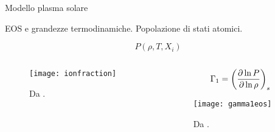 \documentclass[10pt,xcolor={usenames},fleqn,mathserif,serif]{beamer}
\begin{document}
\begin{frame}{Modello plasma solare}

\begin{block}{EOS e grandezze termodinamiche. Popolazione di stati atomici.}

\[P(\rho,T,X_i)\]

\begin{columns}

\begin{column}{0.5\textwidth}

\begin{figure}[!ht]
        \texttt{[image: ionfraction]}
        \caption{Da \cite{basu2008helioseismology}.}
\end{figure}%


\end{column}

\begin{column}{0.5\textwidth}

\[\Gamma_1=\left(\frac{\partial \ln{P}}{\partial \ln{\rho}}\right)_s\]

\begin{figure}[!ht]
        \texttt{[image: gamma1eos]}
        \caption{Da \cite{trampedach2006synoptic}.}
\end{figure}

\end{column}

\end{columns}

\end{block}

\end{frame}
\end{document}
